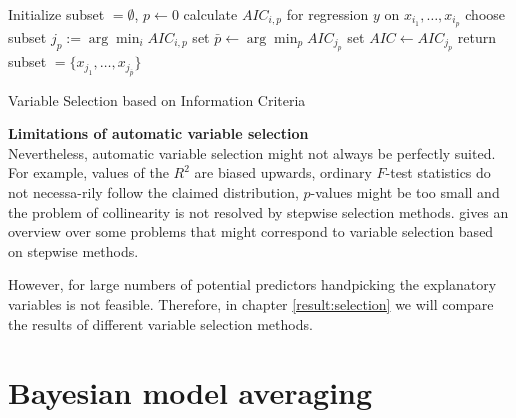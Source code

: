 \documentclass[a4paper, 12pt]{scrreprt}
\begin{document}
\begin{algorithm}
	
	Initialize subset $= \emptyset$, $p \gets 0$\;
	{
		{
			calculate $AIC_{i,p}$ for regression $y$ on $x_{i_1},\ldots, x_{i_p}$\;
		}
		choose subset $j_p := \arg\min_i AIC_{i,p}$\;
	}
	set $\bar{p} \gets \arg\min_p AIC_{j_p}$\;
	set $AIC \gets AIC_{j_p}$\;
	return subset $= \{ x_{j_1}, \ldots, x_{j_{\bar{p}}} \}$
	\caption{Variable Selection based on Information Criteria}
	\label{algo:AIC}
\end{algorithm}


\textbf{Limitations of automatic variable selection} \\
Nevertheless, automatic variable selection might not always be perfectly suited.
For example, values of the $R^2$ are biased upwards, ordinary $F$-test statistics do not necessa-rily follow the claimed distribution, $p$-values might be too small and the problem of collinearity is not resolved by stepwise selection methods.
\textcite[chapter 4.3]{harrell2015strategies} gives an overview over some problems that might correspond to variable selection based on stepwise methods. 

However, for large numbers of potential predictors handpicking the explanatory variables is not feasible. Therefore,  in chapter \ref{result:selection} we will compare the results of different variable selection methods.



\section{Bayesian model averaging}\label{par:BMA}
\end{document}
